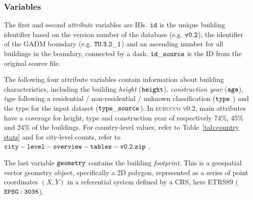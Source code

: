 \documentclass[fleqn,10pt]{wlscirep}
\begin{document}
\subsubsection*{Variables}
The first and second \textit{attribute} variables are IDs.  ${\tt id}$ is the unique building identifier based on the version number of the database (e.g. ${\tt  v0.2}$), the identifier of the GADM boundary (e.g. ${\tt TU.3.2\_1}$) and an ascending number for all buildings in the boundary, connected by a dash. 
${\tt id\_source}$ is the ID from the original source file.
 
The following four attribute variables contain information about building characteristics, including the building \textit{height} (${\tt height}$), \textit{construction year} ($\tt{age}$), \textit{type} following a residential / non-residential / unknown classification (${\tt type}$ ) and the type for the input dataset (${\tt type\_source}$). In \textsc{eubucco} v0.2, main attributes have a coverage for height, type and construction year of respectively 74\%, 45\% and 24\% of the buildings. For country-level values, refer to  Table~\ref{tab:country stats}  and for city-level counts, refer to ${\tt city-level-overview-tables-v0.2.zip}$ .  

The last variable $\tt{geometry}$ contains the building \textit{footprint}. This is a geospatial vector geometry object, specifically a 2D polygon, represented as a series of point coordinates $(X,Y)$ in a referential system defined by a CRS, here ETRS89 ($\tt{EPSG:3035}$). 
\end{document}

